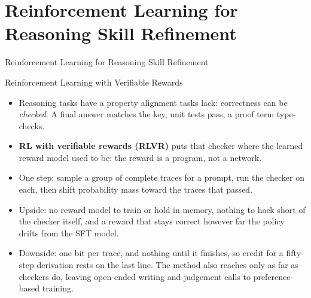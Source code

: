 \section{Reinforcement Learning for Reasoning Skill Refinement}
\begin{frame}[allowframebreaks]{}
    \LARGE Reinforcement Learning for Reasoning Skill Refinement
\end{frame}

\begin{frame}{Reinforcement Learning with Verifiable Rewards}
    \begin{itemize}\itemsep0.3em
        \item Reasoning tasks have a property alignment tasks lack: correctness can be \emph{checked}. A final answer matches the key, unit tests pass, a proof term type-checks.
        \item \textbf{RL with verifiable rewards (RLVR)} puts that checker where the learned reward model used to be: the reward is a program, not a network.
        \item One step: sample a group of complete traces for a prompt, run the checker on each, then shift probability mass toward the traces that passed.
        \item Upside: no reward model to train or hold in memory, nothing to hack short of the checker itself, and a reward that stays correct however far the policy drifts from the SFT model.
        \item Downside: one bit per trace, and nothing until it finishes, so credit for a fifty-step derivation rests on the last line. The method also reaches only as far as checkers do, leaving open-ended writing and judgement calls to preference-based training.
    \end{itemize}
\end{frame}

